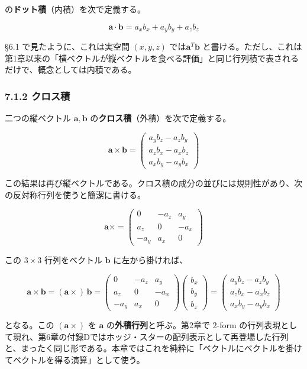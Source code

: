 \documentclass[a4paper,12pt,openany]{book}
\begin{document}
の\textbf{ドット積}（内積）を次で定義する。

\[\mathbf{a} \cdot \mathbf{b} = a_x b_x + a_y b_y + a_z b_z\]

§6.1 で見たように、これは実空間 \((x,y,z)\)
では\(\mathbf{a}^T \mathbf{b}\)
と書ける。ただし、これは第1章以来の「横ベクトルが縦ベクトルを食べる評価」と同じ行列積で表されるだけで、概念としては内積である。

\hypertarget{ux30afux30edux30b9ux7a4d}{%
\subsubsection{7.1.2 クロス積}\label{ux30afux30edux30b9ux7a4d}}

二つの縦ベクトル \(\mathbf{a}, \mathbf{b}\)
の\textbf{クロス積}（外積）を次で定義する。

\[\mathbf{a} \times \mathbf{b} = \begin{pmatrix}
a_y b_z - a_z b_y \\
a_z b_x - a_x b_z \\
a_x b_y - a_y b_x
\end{pmatrix}\]

この結果は再び縦ベクトルである。クロス積の成分の並びには規則性があり、次の反対称行列を使うと簡潔に書ける。

\[\mathbf{a} \times = \begin{pmatrix}
0 & -a_z & a_y \\
a_z & 0 & -a_x \\
-a_y & a_x & 0
\end{pmatrix}\]

この \(3\times 3\) 行列をベクトル \(\mathbf{b}\) に左から掛ければ、

\[\mathbf{a} \times \mathbf{b} = (\mathbf{a} \times)\,\mathbf{b} = \begin{pmatrix}
0 & -a_z & a_y \\
a_z & 0 & -a_x \\
-a_y & a_x & 0
\end{pmatrix}\begin{pmatrix}
b_x \\ b_y \\ b_z
\end{pmatrix} = \begin{pmatrix}
a_y b_z - a_z b_y \\
a_z b_x - a_x b_z \\
a_x b_y - a_y b_x
\end{pmatrix}\]

となる。この \((\mathbf{a} \times)\) を \(\mathbf{a}\)
の\textbf{外積行列}と呼ぶ。第2章で \(2\)-form
の行列表現として現れ、第6章の付録Dではホッジ・スターの配列表示として再登場した行列と、まったく同じ形である。本章ではこれを純粋に「ベクトルにベクトルを掛けてベクトルを得る演算」として使う。
\end{document}
